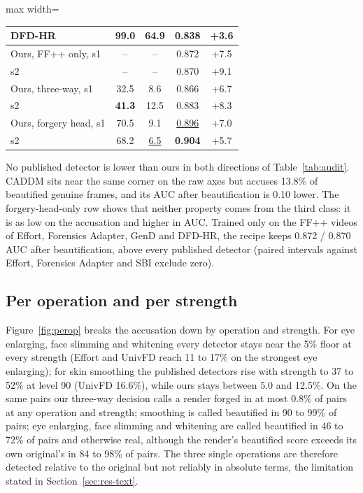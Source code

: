 \documentclass[conference,a4paper]{IEEEtran}
\begin{document}
\begin{table}[!htb]
\begin{adjustbox}{max width=\columnwidth}
\begin{tabular}{@{}lcccc@{}}
DFD-HR~\cite{dfdhr2026} & 99.0 & 64.9 & 0.838 & +3.6 \\
\midrule
Ours, FF++ only, s1 & -- & -- & 0.872 & +7.5 \\
\phantom{Ours, FF++ only,} s2 & -- & -- & 0.870 & +9.1 \\
Ours, three-way, s1 & 32.5 & 8.6 & 0.866 & +6.7 \\
\phantom{Ours, three-way,} s2 & \textbf{41.3} & 12.5 & 0.883 & +8.3 \\
Ours, forgery head, s1 & 70.5 & 9.1 & \underline{0.896} & +7.0 \\
\phantom{Ours, forgery head,} s2 & 68.2 & \underline{6.5} & \textbf{0.904} & +5.7 \\
\bottomrule
\end{tabular}
\end{adjustbox}
\end{table}

No published detector is lower than ours in both directions of Table~\ref{tab:audit}. CADDM sits near the same corner on the raw
axes but accuses 13.8\% of beautified genuine frames, and its AUC after beautification is 0.10 lower. The forgery-head-only
row shows that neither property comes from the third class: it is as low on the accusation and higher in AUC.
Trained only on the FF++ videos of Effort, Forensics Adapter, GenD and DFD-HR, the recipe keeps 0.872 / 0.870 AUC after
beautification, above every published detector (paired intervals against Effort, Forensics Adapter and SBI exclude zero).

\subsection{Per operation and per strength}
\label{sec:res-perop}

Figure~\ref{fig:perop} breaks the accusation down by operation and strength. For eye enlarging, face slimming and whitening
every detector stays near the 5\% floor at every strength (Effort and UnivFD reach 11 to 17\% on the strongest eye
enlarging); for skin smoothing the published detectors rise with strength to 37 to 52\% at level 90 (UnivFD 16.6\%), while
ours stays between 5.0 and 12.5\%. On the same pairs our three-way decision calls a render forged in at most 0.8\% of
pairs at any operation and strength; smoothing is called beautified in 90 to 99\%
of pairs; eye enlarging, face slimming and whitening are called beautified in 46 to 72\% of pairs and otherwise real, although
the render's beautified score exceeds its own original's in 84 to 98\% of pairs. The three single operations are therefore
detected relative to the original but not reliably in absolute terms, the limitation stated in Section~\ref{sec:res-text}.
\end{document}
